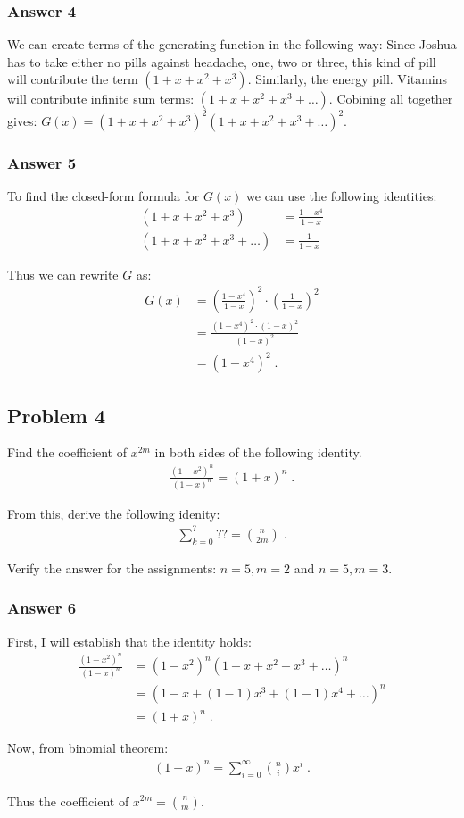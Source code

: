 \documentclass[11pt]{article}
\begin{document}
\subsubsection{Answer 4}
\label{sec:orgheadline6}
We can create terms of the generating function in the following way: Since
Joshua has to take either no pills against headache, one, two or three, this
kind of pill will contribute the term \((1 + x + x^2 + x^3)\).  Similarly,
the energy pill.  Vitamins will contribute infinite sum terms:
\((1 + x + x^2 + x^3 + \hdots)\).  Cobining all together gives:
\(G(x) = (1 + x + x^2 + x^3)^2(1 + x + x^2 + x^3 + \hdots)^2\).

\subsubsection{Answer 5}
\label{sec:orgheadline7}
To find the closed-form formula for \(G(x)\) we can use the following identities:
\begin{align*}
  (1 + x + x^2 + x^3) &= \frac{1 - x^4}{1 - x} \\
  (1 + x + x^2 + x^3 + \hdots) &= \frac{1}{1 - x}
\end{align*}

Thus we can rewrite \(G\) as:
\begin{align*}
  G(x) &= \left(\frac{1 - x^4}{1 - x}\right)^2 \cdot \left(\frac{1}{1 - x}\right)^2 \\
       &= \frac{(1 - x^4)^2 \cdot (1 - x)^2}{(1 - x)^2} \\
       &= (1 - x^4)^2\;.
\end{align*}

\subsection{Problem 4}
\label{sec:orgheadline10}
Find the coefficient of \(x^{2m}\) in both sides of the following identity.
\begin{align*}
  \frac{(1 - x^2)^n}{(1 - x)^n} = (1 + x)^n\;.
\end{align*}

From this, derive the following idenity:
\begin{align*}
  \sum_{k=0}^? ?? = {n \choose 2m}\;.
\end{align*}

Verify the answer for the assignments: \(n = 5, m = 2\) and \(n = 5, m = 3\).

\subsubsection{Answer 6}
\label{sec:orgheadline9}
First, I will establish that the identity holds:
\begin{align*}
  \frac{(1 - x^2)^n}{(1 - x)^n} &= (1 - x^2)^n (1 + x + x^2 + x^3 + \hdots)^n \\
                               &= (1 - x + (1 - 1)x^3 + (1 - 1)x^4 + \hdots)^n \\
                               &= (1 + x)^n\;.
\end{align*}

Now, from binomial theorem:
\begin{align*}
  (1 + x)^n = \sum_{i=0}^\infty {n \choose i} x^i\;.
\end{align*}

Thus the coefficient of \(x^{2m} = {n \choose m}\).
\end{document}
